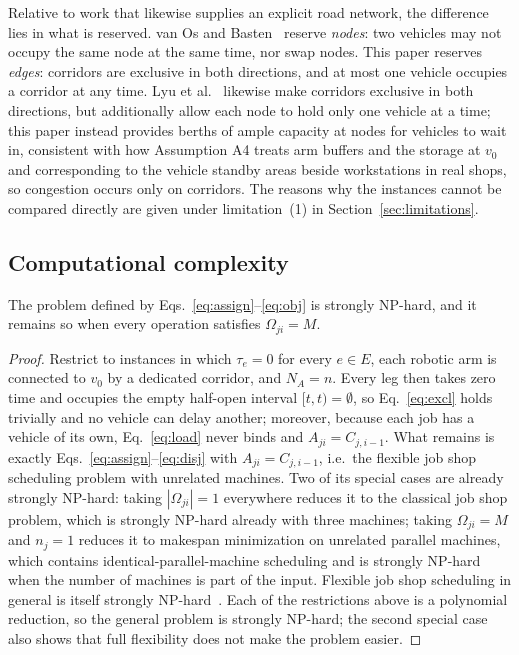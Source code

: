 Relative to work that likewise supplies an explicit road network, the difference lies in what is reserved. van Os and Basten~\cite{vanos2026exact}
reserve \emph{nodes}: two vehicles may not occupy the same node at the same time, nor swap nodes. This paper reserves \emph{edges}: corridors are exclusive in both directions, and at most one vehicle occupies a corridor at any time.
Lyu et al.~\cite{lyu2019approach} likewise make corridors exclusive in both directions, but additionally allow each node to hold only one vehicle at a time; this paper instead provides berths of ample capacity at nodes for vehicles to wait in, consistent with how Assumption A4 treats arm buffers and the storage at $v_0$ and corresponding to the vehicle standby areas beside workstations in real shops, so congestion occurs only on corridors.
The reasons why the instances cannot be compared directly are given under limitation~(1) in Section~\ref{sec:limitations}.

\subsection{Computational complexity}

\begin{prop}
\label{prop:np_hard}
The problem defined by Eqs.~\eqref{eq:assign}--\eqref{eq:obj} is strongly NP-hard, and it remains so when every operation satisfies
$\Omega_{ji}=M$.
\end{prop}

\begin{proof}
Restrict to instances in which $\tau_e=0$ for every $e\in E$, each robotic arm is connected to $v_0$ by a dedicated corridor,
and $N_A=n$. Every leg then takes zero time and occupies the empty half-open interval $[t,t)=\emptyset$, so Eq.~\eqref{eq:excl}
holds trivially and no vehicle can delay another; moreover, because each job has a vehicle of its own, Eq.~\eqref{eq:load} never binds and
$A_{ji}=C_{j,i-1}$. What remains is exactly
Eqs.~\eqref{eq:assign}--\eqref{eq:disj} with $A_{ji}=C_{j,i-1}$, i.e.\ the flexible job shop scheduling problem with unrelated machines. Two of its
special cases are already strongly NP-hard: taking $|\Omega_{ji}|=1$ everywhere reduces it to the classical job shop problem, which is
strongly NP-hard already with three machines; taking $\Omega_{ji}=M$ and $n_j=1$ reduces it to makespan minimization on unrelated parallel
machines, which contains identical-parallel-machine scheduling and is strongly NP-hard when the number of machines is part of the input.
Flexible job shop scheduling in general is itself strongly NP-hard~\cite{dauzereperes2024fjsp}. Each of the restrictions above is a
polynomial reduction, so the general problem is strongly NP-hard; the second special case also shows that full flexibility does not make the problem easier.
\end{proof}

